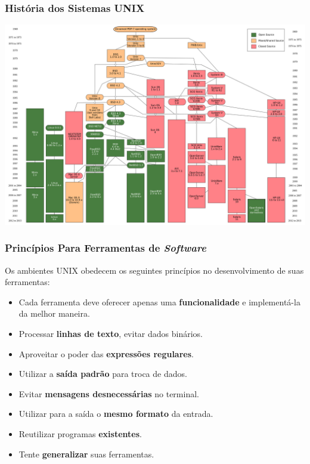 \documentclass{beamer}
\begin{document}
\begin{frame}
   \frametitle{História dos Sistemas UNIX}
   \includegraphics[scale=0.17]{figuras/Unix_history-simple.png}
\end{frame}

\begin{frame}
   \frametitle{Princípios Para Ferramentas de \textit{Software}}
   Os ambientes UNIX obedecem os seguintes princípios no desenvolvimento de suas ferramentas:
   \begin{itemize}
      \item Cada ferramenta deve oferecer apenas uma \textbf{funcionalidade} e implementá-la da melhor maneira.
      \item Processar \textbf{linhas de texto}, evitar dados binários.
      \item Aproveitar o poder das \textbf{expressões regulares}.
      \item Utilizar a \textbf{saída padrão} para troca de dados.
      \item Evitar \textbf{mensagens desnecessárias} no terminal.
      \item Utilizar para a saída o \textbf{mesmo formato} da entrada.
      \item Reutilizar programas \textbf{existentes}.
      \item Tente \textbf{generalizar} suas ferramentas.
   \end{itemize}
\end{frame}
\end{document}
